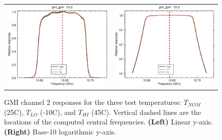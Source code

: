 \begin{figure}[htp]
  \centering
  \begin{tabular}{c c}
    \includegraphics[scale=0.3]{graphics/lin/gmi_gpm-2.eps} &
    \includegraphics[scale=0.3]{graphics/log/gmi_gpm-2.eps}
  \end{tabular}
  \caption{GMI channel 2 responses for the three test temperatures: $T_{NOM}$ (25\textdegree{}C), $T_{LO}$ (-10\textdegree{}C), and $T_{HI}$ (45\textdegree{}C). Vertical dashed lines are the locations of the computed central frequencies. \textbf{(Left)} Linear y-axis. \textbf{(Right)} Base-10 logarithmic y-axis.}
  \label{fig:ch2_response}
\end{figure}

